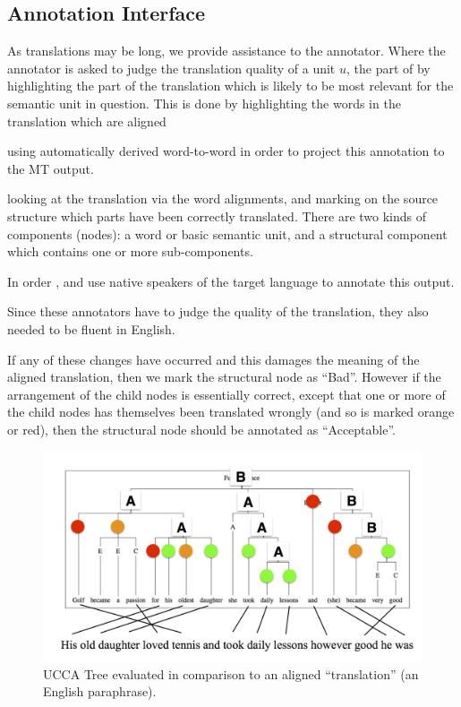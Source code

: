 \documentclass[11pt]{article}
\newcommand{\bh}[1]{\footnote{\color{blue}BH: #1}}
\begin{document}
\subsection{Annotation Interface}

As translations may be long, we provide assistance to the annotator.
Where the annotator is asked to judge the translation quality of a unit $u$,
the part of by highlighting the part of the translation which is likely to be
most relevant for the semantic unit in question.
This is done by highlighting the words in the translation which are aligned 

using automatically derived word-to-word  in order to project
this annotation to the MT output.


looking at the translation via the word alignments, and marking
on the source structure which parts have been correctly translated.
There are two kinds of components (nodes): a word or basic semantic unit, and a structural component
which contains one or more sub-components. 

In order 
, and use native speakers of the target
language to annotate this output.


Since these annotators have to judge the quality of the translation,
they also needed to be fluent in English.




If any of these changes have occurred and this damages the meaning of the aligned translation, then we mark the 
structural node as ``Bad''. 
However if the arrangement of the child nodes is essentially correct, except that one or
more of the child nodes has themselves been translated wrongly (and so is marked
orange or red), then the structural node should be 
annotated as ``Acceptable''.

\begin{figure}[t]
    \includegraphics[width=1\textwidth]{ucca-tree-mteval}
    \caption{UCCA Tree evaluated in comparison to an aligned ``translation'' (an
	English paraphrase).}
    \label{ucca-tree-mteval}
\end{figure}
\end{document}

